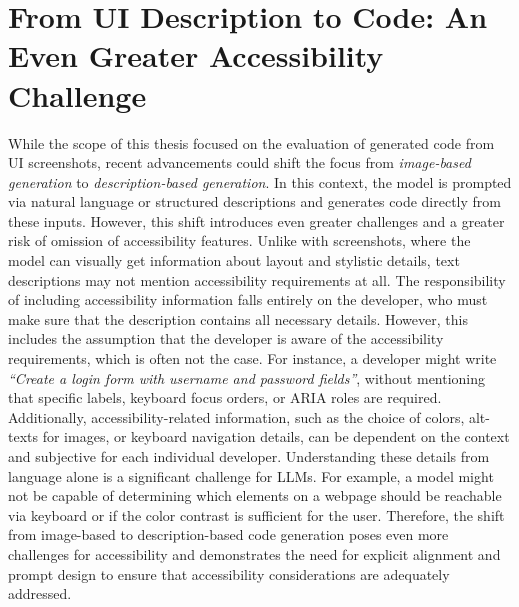 \section{From UI Description to Code: An Even Greater Accessibility Challenge}
While the scope of this thesis focused on the evaluation of 
generated code from UI screenshots, recent advancements could 
shift the focus from \emph{image-based generation} to 
\emph{description-based generation}. In this context, 
the model is prompted via natural language or structured 
descriptions and generates code directly from these inputs.
However, this shift introduces even greater challenges 
and a greater risk of omission of accessibility features.\newline
Unlike with screenshots, where the model can visually get 
information about layout and stylistic details, text 
descriptions may not mention accessibility requirements at all.
The responsibility of including accessibility information falls entirely 
on the developer, who must make sure that the description 
contains all necessary details. However, this includes the 
assumption that the developer is aware of the accessibility requirements, 
which is often not the case. For instance, a developer
might write \textit{``Create a login form with username 
and password fields''}, without mentioning that specific 
labels, keyboard focus orders, or ARIA roles are required.
Additionally, accessibility-related information, such as
the choice of colors, alt-texts for images, or keyboard 
navigation details, can be dependent on the context and 
subjective for each individual developer. Understanding these 
details from language alone is a significant challenge for
LLMs. For example, a model might not be capable of determining
which elements on a webpage should be reachable via keyboard
or if the color contrast is sufficient for the user. \newline
Therefore, the shift from image-based to description-based
code generation poses even more challenges for accessibility and 
demonstrates the need for explicit alignment and prompt design 
to ensure that accessibility considerations are adequately addressed.
